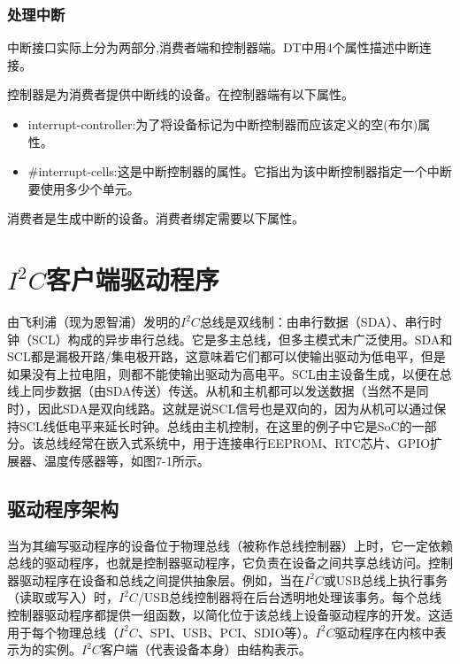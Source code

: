\documentclass[lang=cn,newtx,10pt,scheme=chinese]{elegantbook}
\begin{document}
\subsection{处理中断}

中断接口实际上分为两部分,消费者端和控制器端。DT中用4个属性描述中断连接。

控制器是为消费者提供中断线的设备。在控制器端有以下属性。

\begin{itemize}
\item interrupt-controller:为了将设备标记为中断控制器而应该定义的空(布尔)属性。
\item \#interrupt-cells:这是中断控制器的属性。它指出为该中断控制器指定一个中断要使用多少个单元。
\end{itemize}

消费者是生成中断的设备。消费者绑定需要以下属性。



\chapter{\texorpdfstring{$I^2C$客户端驱动程序}{I2C客户端驱动程序}}

由飞利浦（现为恩智浦）发明的$I^2C$总线是双线制：由串行数据（SDA）、串行时钟（SCL）构成的异步串行总线。它是多主总线，但多主模式未广泛使用。SDA和SCL都是漏极开路/集电极开路，这意味着它们都可以使输出驱动为低电平，但是如果没有上拉电阻，则都不能使输出驱动为高电平。SCL由主设备生成，以便在总线上同步数据（由SDA传送）传送。从机和主机都可以发送数据（当然不是同时），因此SDA是双向线路。这就是说SCL信号也是双向的，因为从机可以通过保持SCL线低电平来延长时钟。总线由主机控制，在这里的例子中它是SoC的一部分。该总线经常在嵌入式系统中，用于连接串行EEPROM、RTC芯片、GPIO扩展器、温度传感器等，如图7-1所示。

\section{驱动程序架构}

当为其编写驱动程序的设备位于物理总线（被称作总线控制器）上时，它一定依赖总线的驱动程序，也就是控制器驱动程序，它负责在设备之间共享总线访问。控制器驱动程序在设备和总线之间提供抽象层。例如，当在$I^2C$或USB总线上执行事务（读取或写入）时，$I^2C$/USB总线控制器将在后台透明地处理该事务。每个总线控制器驱动程序都提供一组函数，以简化位于该总线上设备驱动程序的开发。这适用于每个物理总线（$I^2C$、SPI、USB、PCI、SDIO等）。$I^2C$驱动程序在内核中表示为的实例。$I^2C$客户端（代表设备本身）由结构表示。
\end{document}
